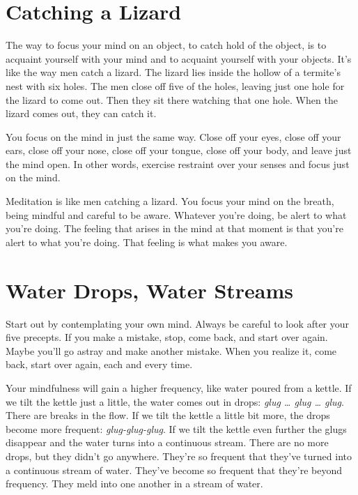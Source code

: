 \clearpage

\section{Catching a Lizard}

The way to focus your mind on an object, to catch hold of the object, is to acquaint yourself with your mind and to acquaint yourself with your objects. It's like the way men catch a lizard. The lizard lies inside the hollow of a termite's nest with six holes. The men close off five of the holes, leaving just one hole for the lizard to come out. Then they sit there watching that one hole. When the lizard comes out, they can catch it.

You focus on the mind in just the same way. Close off your eyes, close off your ears, close off your nose, close off your tongue, close off your body, and leave just the mind open. In other words, exercise restraint over your senses and focus just on the mind. 

Meditation is like men catching a lizard. You focus your mind on the breath, being mindful and careful to be aware. Whatever you're doing, be alert to what you're doing. The feeling that arises in the mind at that moment is that you're alert to what you're doing. That feeling is what makes you aware. 

\clearpage

\section{Water Drops, Water Streams}

Start out by contemplating your own mind. Always be careful to look after your five precepts. If you make a mistake, stop, come back, and start over again. Maybe you'll go astray and make another mistake. When you realize it, come back, start over again, each and every time.

Your mindfulness will gain a higher frequency, like water poured from a kettle. If we tilt the kettle just a little, the water comes out in drops: \textit{glug \ldots{}  glug \ldots{}  glug}. There are breaks in the flow. If we tilt the kettle a little bit more, the drops become more frequent: \textit{glug-glug-glug}. If we tilt the kettle even further the glugs disappear and the water turns into a continuous stream. There are no more drops, but they didn't go anywhere. They're so frequent that they've turned into a continuous stream of water. They've become so frequent that they're beyond frequency. They meld into one another in a stream of water.

